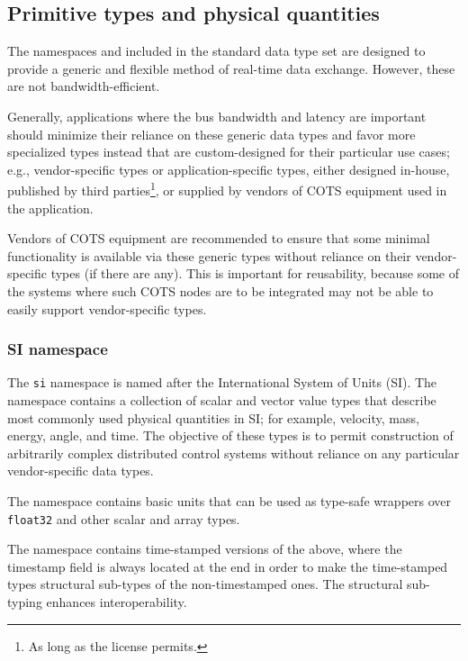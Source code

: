 
\subsection{Primitive types and physical quantities}

The namespaces  and 
included in the standard data type set are designed to provide a generic and flexible
method of real-time data exchange. However, these are not bandwidth-efficient.

Generally, applications where the bus bandwidth and latency are important should minimize their reliance
on these generic data types and favor more specialized types instead that are custom-designed for their
particular use cases; e.g., vendor-specific types or application-specific types, either
designed in-house, published by third parties\footnote{As long as the license permits.}, or supplied by
vendors of COTS equipment used in the application.

Vendors of COTS equipment are recommended to ensure that some minimal functionality is available
via these generic types without reliance on their vendor-specific types (if there are any).
This is important for reusability, because some of the systems where such COTS nodes are
to be integrated may not be able to easily support vendor-specific types.

\subsubsection{SI namespace}\label{sec:application_si}

The \verb|si| namespace is named after the International System of Units (SI).
The namespace contains a collection of scalar and vector value types that describe most commonly used
physical quantities in SI; for example, velocity, mass, energy, angle, and time.
The objective of these types is to permit construction of arbitrarily complex distributed control systems without
reliance on any particular vendor-specific data types.

The namespace  contains basic units that can be used as type-safe wrappers
over \verb|float32| and other scalar and array types.

The namespace  contains time-stamped versions of the above,
where the timestamp field is always located at the end in order to make the time-stamped types
structural sub-types of the non-timestamped ones.
The structural sub-typing enhances interoperability.

